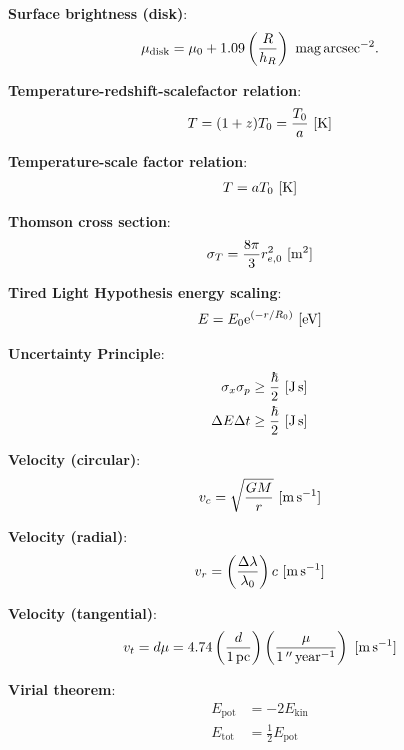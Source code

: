 \documentclass[a4paper,11pt]{article}
\begin{document}
{\noindent}\textbf{Surface brightness (disk)}:
\begin{align*}
    \mu_\mathrm{disk} = \mu_0 + 1.09\left(\frac{R}{h_R}\right) ~ {\rm mag\,arcsec^{-2}}.
\end{align*}

{\noindent}\textbf{Temperature-redshift-scalefactor relation}:
\begin{align*}
    T = (1+z)T_0 = \frac{T_0}{a} ~ [{\rm K}]
\end{align*}

{\noindent}\textbf{Temperature-scale factor relation}:
\begin{align*}
    T = aT_0 ~ [{\rm K}]
\end{align*}

{\noindent}\textbf{Thomson cross section}:
\begin{align*}
\sigma_T = \frac{8\pi}{3}r_{e,0}^2 ~ [{\rm m^2}]
\end{align*}

{\noindent}\textbf{Tired Light Hypothesis energy scaling}:
\begin{align*}
    E = E_0 \mathrm{e}^{(-r/R_0)} ~ [{\rm eV}]
\end{align*}

{\noindent}\textbf{Uncertainty Principle}:
\begin{align*}
    \sigma_x\sigma_p \geq \frac{\hbar}{2} ~ [{\rm J\,s}] \\
    \Delta E \Delta t \geq \frac{\hbar}{2} ~ [{\rm J\,s}]
\end{align*}

{\noindent}\textbf{Velocity (circular)}:
\begin{align*}
    v_c = \sqrt{\frac{GM}{r}} ~ [{\rm m\,s^{-1}}]
\end{align*}

{\noindent}\textbf{Velocity (radial)}:
\begin{align*}
    v_r = \left(\frac{\Delta\lambda}{\lambda_0}\right)c ~ [{\rm m\,s^{-1}}]
\end{align*}

{\noindent}\textbf{Velocity (tangential)}:
\begin{align*}
    v_t = d\mu = 4.74\left(\frac{d}{1\,{\rm pc}}\right) \left(\frac{\mu}{1\,''\,{\rm year^{-1}}}\right) ~ [{\rm m\,s^{-1}}]
\end{align*}

{\noindent}\textbf{Virial theorem}:
\begin{align*}
    E_\mathrm{pot} &= -2E_\mathrm{kin} \\
    E_\mathrm{tot} &= \frac{1}{2}E_\mathrm{pot}
\end{align*}
\end{document}
